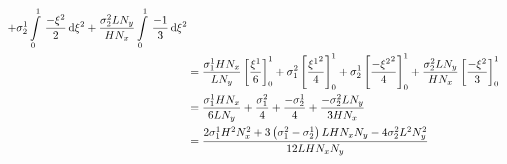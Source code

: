 \begin{equation}
\begin{aligned}
    +\conductivitytensorsymbol^{1}_{2}\gint{0}{1}{\dfrac{-\xitwo}{2}}{\xitwo}
    +\dfrac{\conductivitytensorsymbol^{2}_{2} L N_{y}}{H N_{x}}\gint{0}{1}{\dfrac{-1}{3}}{\xitwo} \\
    &=\dfrac{\conductivitytensorsymbol^{1}_{1} H N_{x}}{L N_{y}}\sqbrac{\dfrac{\xione}{6}}^{1}_{0}
    +\conductivitytensorsymbol^{2}_{1}\sqbrac{\dfrac{\xionesq}{4}}^{1}_{0}
    +\conductivitytensorsymbol^{1}_{2}\sqbrac{\dfrac{-\xitwosq}{4}}^{1}_{0}
    +\dfrac{\conductivitytensorsymbol^{2}_{2} L N_{y}}{H N_{x}}\sqbrac{\dfrac{-\xitwo}{3}}^{1}_{0} \\
    &=\dfrac{\conductivitytensorsymbol^{1}_{1} H N_{x}}{6 L N_{y}}+\dfrac{\conductivitytensorsymbol^{2}_{1}}{4}+
    \dfrac{-\conductivitytensorsymbol^{1}_{2}}{4}+\dfrac{-\conductivitytensorsymbol^{2}_{2} L N_{y}}{3 H N_{x}} \\
    &=\dfrac{2\conductivitytensorsymbol^{1}_{1}H^{2}N_{x}^{2}+3\pbrac{\conductivitytensorsymbol^{2}_{1}-
        \conductivitytensorsymbol^{1}_{2}}L H N_{x} N_{y}-4\conductivitytensorsymbol^{2}_{2}L^{2}N_{y}^{2}}{12 L H N_{x} N_{y}}
  \end{aligned}
\end{equation}

